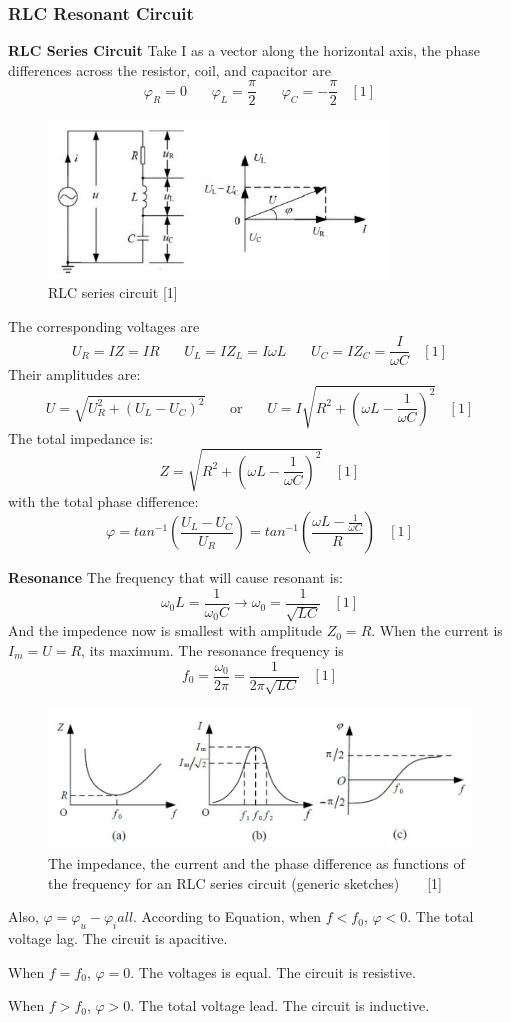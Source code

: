 \documentclass[12pt,a4paper]{article}
\begin{document}
\subsubsection{RLC Resonant Circuit}
\textbf{\qquad RLC Series Circuit}
Take I as a vector along the horizontal axis, the phase differences across the resistor, coil, and capacitor are
$$\varphi_R=0~~~~~~~~\varphi_L=\frac{\pi}{2}~~~~~~~~\varphi_C=-\frac{\pi}{2}~~~~[1]$$
\begin{figure}[H]
    \centering
    \includegraphics[width=9cm]{rlcseries.png}
    \caption{RLC series circuit    [1]}
    \label{rlcseries}
\end{figure}
The corresponding voltages are
$$U_R=IZ=IR~~~~~~~~U_L=IZ_L=I\omega L~~~~~~~~U_C=IZ_C=\frac{I}{\omega C}~~~~[1]$$
Their amplitudes are:
$$U=\sqrt{U^2_R+(U_L-U_C)^2}~~~~~~~~\text{or}~~~~~~~~U=I\sqrt{R^2+(\omega L-\frac{1}{\omega C})^2}~~~~[1]$$
The total impedance is:
$$Z=\sqrt{R^2+(\omega L-\frac{1}{\omega C})^2}~~~~[1]$$
with the total phase difference:
$$\varphi=tan^{-1}(\frac{U_L-U_C}{U_R})=tan^{-1}(\frac{\omega L-\frac{1}{\omega C}}{R})~~~~[1]$$

\textbf{\qquad Resonance}
The frequency that will cause resonant is:
$$\omega_0L=\frac{1}{\omega_0C}\longrightarrow\omega_0=\frac{1}{\sqrt{LC}}~~~~[1]$$ And the impedence now is smallest with amplitude $Z_0 = R$. When the current is $I_m = U=R$, its maximum. The resonance frequency is $$f_0=\frac{\omega_0}{2\pi}=\frac{1}{2\pi\sqrt{LC}}~~~~[1]$$
\begin{figure}[H]
    \centering
    \includegraphics[width=12cm]{rlcgeneral.png}
    \caption{The impedance, the current and the phase difference as functions of the frequency for an RLC series circuit (generic sketches)~~~~[1]}
    \label{rlcgeneral}
\end{figure}
Also, $\varphi=\varphi_u-\varphi_iall$. According to Equation, when $f < f_0$, $\varphi< 0$. The total voltage lag. The circuit is apacitive.\par 
When $f = f_0$, $\varphi= 0$. The voltages is equal. The circuit is resistive. \par
When $f > f_0$, $\varphi> 0$. The total voltage lead. The circuit is inductive.
\end{document}
